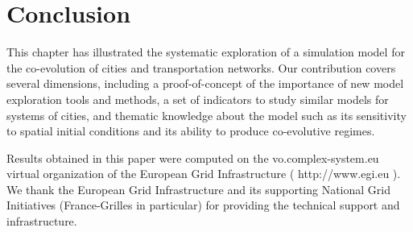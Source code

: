 \documentclass[graybox]{svmult}
\begin{document}
\section{Conclusion}



This chapter has illustrated the systematic exploration of a simulation model for the co-evolution of cities and transportation networks. Our contribution covers several dimensions, including a proof-of-concept of the importance of new model exploration tools and methods, a set of indicators to study similar models for systems of cities, and thematic knowledge about the model such as its sensitivity to spatial initial conditions and its ability to produce co-evolutive regimes.





%
\begin{acknowledgement}
Results obtained in this paper were computed on the vo.complex-system.eu virtual organization of the European Grid Infrastructure ( http://www.egi.eu ). We thank the European Grid Infrastructure and its supporting National Grid Initiatives (France-Grilles in particular) for providing the technical support and infrastructure.
\end{acknowledgement}


%
%

\end{document}
